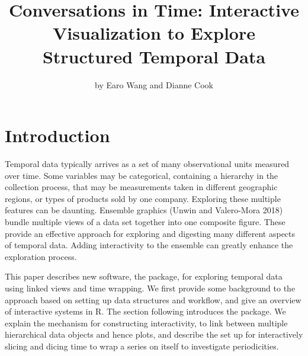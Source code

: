 \title{Conversations in Time: Interactive Visualization to Explore Structured Temporal Data}
\author{by Earo Wang and Dianne Cook}

\maketitle


\hypertarget{introduction}{%
\section{Introduction}\label{introduction}}

Temporal data typically arrives as a set of many observational units measured over time. Some variables may be categorical, containing a hierarchy in the collection process, that may be measurements taken in different geographic regions, or types of products sold by one company. Exploring these multiple features can be daunting. Ensemble graphics (Unwin and Valero-Mora 2018) bundle multiple views of a data set together into one composite figure. These provide an effective approach for exploring and digesting many different aspects of temporal data. Adding interactivity to the ensemble can greatly enhance the exploration process.

This paper describes new software, the  package, for exploring temporal data using linked views and time wrapping. We first provide some background to the approach based on setting up data structures and workflow, and give an overview of interactive systems in R. The section following introduces the  package. We explain the mechanism for constructing interactivity, to link between multiple hierarchical data objects and hence plots, and describe the set up for interactively slicing and dicing time to wrap a series on itself to investigate periodicities.

